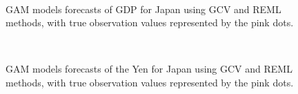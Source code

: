 \documentclass[11pt,regno]{amsart}
\theoremstyle{plain}
\numberwithin{equation}{section}
\begin{document}
\begin{figure}
\centering
\centerline{ \mbox{
  \quad
{}
}}
\caption{GAM models forecasts of GDP for Japan using GCV and REML methods, with true observation values represented by the pink dots.}
\end{figure}

\begin{figure}
\centering
\centerline{ \mbox{
  \quad
{}
}}
\caption{GAM models forecasts of the Yen for Japan using GCV and REML methods, with true observation values represented by the pink dots. }
\end{figure}
\end{document}
